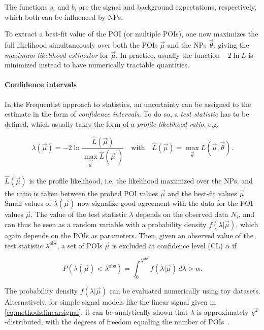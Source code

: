 The functions $s_i$ and $b_i$ are the signal and background expectations, respectively, which both can be influenced by NPs. 

To extract a best-fit value of the POI (or multiple POIs), one now maximizes the full likelihood simultaneously over both the POIs $\vec{\mu}$ and the NPs $\vec{\theta}$, giving the \textit{maximum likelihood estimator} for $\vec{\mu}$. In practice, usually the function $-2 \ln L$ is minimized instead to have numerically tractable quantities. 

\paragraph{Confidence intervals}

In the Frequentist approach to statistics, an uncertainty can be assigned to the estimate in the form of \textit{confidence intervals}. To do so, a \textit{test statistic} has to be defined, which usually takes the form of a \textit{profile likelihood ratio}, e.g.~\cite{Cowan:2010js}

\begin{equation}
\label{eq:methods:teststat}
    \lambda (\vec{\mu}) = - 2 \ln \frac { \hat{L} (\vec{\mu}) } { \max_{\vec{\mu}^\prime} \hat{L} (\vec{\mu}^\prime) } 
    \quad \text{with} \quad 
    \hat{L} (\vec{\mu}) = \max_{\vec{\theta}} L (\vec{\mu}, \vec{\theta}).
\end{equation}

$\hat{L} (\vec{\mu})$ is the profile likelihood, i.e. the likelihood maximized over the NPs, and the ratio is taken between the probed POI values $\vec{\mu}$ and the best-fit values $\vec{\mu}^\prime$. Small values of $ \lambda (\vec{\mu})$ now signalize good agreement with the data for the POI values $\vec{\mu}$. The value of the test statistic $\lambda$ depends on the observed data $N_i$, and can thus be seen as a random variable with a probability density $f(\lambda | \vec{\mu})$, which again depends on the POIs as parameters. Then, given an observed value of the test statistic $\lambda^{\mathrm{obs}}$, a set of POIs $\vec{\mu}$ is excluded at confidence level (CL) $\alpha$ if 

\begin{equation}
\label{eq:methods:cl}
    P \left( \lambda (\vec{\mu}) < \lambda^{\mathrm{obs}} \right) = \int_0^{\lambda^{\mathrm{obs}}} f(\lambda | \vec{\mu}) \, d\lambda > \alpha.
\end{equation}

The probability density $f(\lambda | \vec{\mu})$ can be evaluated numerically using toy datasets. Alternatively, for simple signal models like the linear signal given in \cref{eq:methods:linearsignal}, it can be analytically shown that $\lambda$ is approximately $\chi^2$-distributed, with the degrees of freedom equaling the number of POIs~\cite{Wilks:1938dza,Wald:1943}.%


